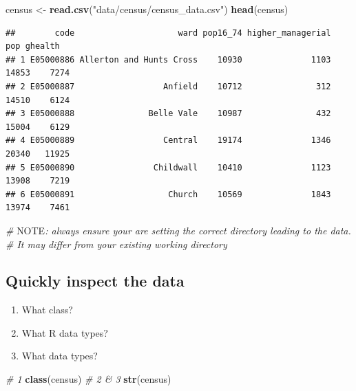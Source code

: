 \documentclass[]{book}
\newenvironment{Shaded}{\begin{snugshade}}{\end{snugshade}}
\newcommand{\KeywordTok}[1]{\textcolor[rgb]{0.13,0.29,0.53}{\textbf{#1}}}
\newcommand{\StringTok}[1]{\textcolor[rgb]{0.31,0.60,0.02}{#1}}
\newcommand{\CommentTok}[1]{\textcolor[rgb]{0.56,0.35,0.01}{\textit{#1}}}
\newcommand{\AlertTok}[1]{\textcolor[rgb]{0.94,0.16,0.16}{#1}}
\newcommand{\NormalTok}[1]{#1}
\begin{document}
\begin{Shaded}
\begin{Highlighting}[]
\NormalTok{census <-}\StringTok{ }\KeywordTok{read.csv}\NormalTok{(}\StringTok{"data/census/census_data.csv"}\NormalTok{)}
\KeywordTok{head}\NormalTok{(census)}
\end{Highlighting}
\end{Shaded}

\begin{verbatim}
##        code                     ward pop16_74 higher_managerial   pop ghealth
## 1 E05000886 Allerton and Hunts Cross    10930              1103 14853    7274
## 2 E05000887                  Anfield    10712               312 14510    6124
## 3 E05000888               Belle Vale    10987               432 15004    6129
## 4 E05000889                  Central    19174              1346 20340   11925
## 5 E05000890                Childwall    10410              1123 13908    7219
## 6 E05000891                   Church    10569              1843 13974    7461
\end{verbatim}

\begin{Shaded}
\begin{Highlighting}[]
\CommentTok{# }\AlertTok{NOTE}\CommentTok{: always ensure your are setting the correct directory leading to the data. }
\CommentTok{# It may differ from your existing working directory}
\end{Highlighting}
\end{Shaded}

\subsection{Quickly inspect the data}\label{quickly-inspect-the-data}

\begin{enumerate}
\def\labelenumi{\arabic{enumi}.}
\item
  What class?
\item
  What R data types?
\item
  What data types?
\end{enumerate}

\begin{Shaded}
\begin{Highlighting}[]
\CommentTok{# 1}
\KeywordTok{class}\NormalTok{(census)}
\CommentTok{# 2 & 3}
\KeywordTok{str}\NormalTok{(census)}
\end{Highlighting}
\end{Shaded}
\end{document}
